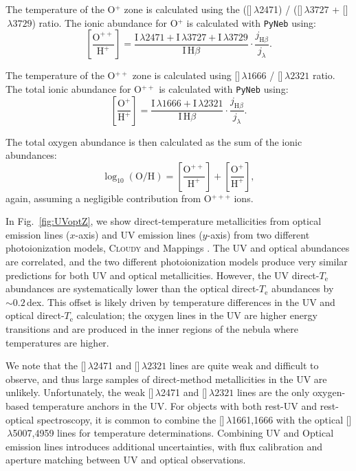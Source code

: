 \documentclass[preprint2]{aastex62}
\newcommand{\Cloudy}{\textsc{Cloudy}\xspace}
\newcommand{\oiii}{[\ion{O}{3}]}
\newcommand{\oii}{[\ion{O}{2}]}
\newcommand{\Te}{\ensuremath{T_{\mathrm{e}}}\xspace}
\begin{document}
The temperature of the O$^{+}$ zone is calculated using the (\oii$\,\lambda$2471) / (\oii$\,\lambda 3727$ + \oii$\,\lambda 3729$) ratio. The ionic abundance for O$^{+}$ is calculated with {\tt PyNeb} using:
\begin{equation}
    \left[ \frac{\mathrm{O}^{++}}{\mathrm{H}^{+}} \right] = \frac{\mathrm{I}\,\lambda 2471 +\mathrm{I}\,\lambda 3727 + \mathrm{I}\,\lambda 3729}{\mathrm{I}\,\mathrm{H}\beta} \cdot \frac{j_{\mathrm{H}\beta}}{j_{\lambda}}.
\end{equation}

The temperature of the O$^{++}$ zone is calculated using \oiii$\,\lambda1666$ / \oiii$\,\lambda2321$ ratio. The total ionic abundance for O$^{++}$ is calculated with {\tt PyNeb} using:
\begin{equation}
    \left[ \frac{\mathrm{O}^{+}}{\mathrm{H}^{+}} \right] = \frac{\mathrm{I}\,\lambda 1666 +\mathrm{I}\,\lambda 2321}{\mathrm{I}\,\mathrm{H}\beta} \cdot \frac{j_{\mathrm{H}\beta}}{j_{\lambda}}.
\end{equation}

The total oxygen abundance is then calculated as the sum of the ionic abundances:
\begin{equation}
    \log_{10}(\mathrm{O}/\mathrm{H}) = \left[ \frac{\mathrm{O}^{++}}{\mathrm{H}^{+}} \right] + \left[ \frac{\mathrm{O}^{+}}{\mathrm{H}^{+}} \right],
\end{equation}
again, assuming a negligible contribution from O$^{+++}$ ions.

In Fig.~\ref{fig:UVoptZ}, we show direct-temperature metallicities from optical emission lines ($x$-axis) and UV emission lines ($y$-axis) from two different photoionization models, \Cloudy \citep[circles;][]{Byler+2018} and {\sc Mappings} \citep[squares;][]{Kewley+2019}. The UV and optical abundances are correlated, and the two different photoionization models produce very similar predictions for both UV and optical metallicities. However, the UV direct-\Te abundances are systematically lower than the optical direct-\Te abundances by $\sim0.2$\,dex. This offset is likely driven by temperature differences in the UV and optical direct-\Te calculation; the oxygen lines in the UV are higher energy transitions and are produced in the inner regions of the nebula where temperatures are higher.

We note that the \oii$\,\lambda$2471 and \oiii$\,\lambda2321$ lines are quite weak and difficult to observe, and thus large samples of direct-method metallicities in the UV are unlikely. Unfortunately, the weak \oii$\,\lambda$2471 and \oiii$\,\lambda2321$ lines are the only oxygen-based temperature anchors in the UV. For objects with both rest-UV and rest-optical spectroscopy, it is common to combine the \oiii$\,\lambda$1661,1666 with the optical \oiii$\,\lambda$5007,4959 lines for temperature determinations. Combining UV and Optical emission lines introduces additional uncertainties, with flux calibration and aperture matching between UV and optical observations.
\end{document}
